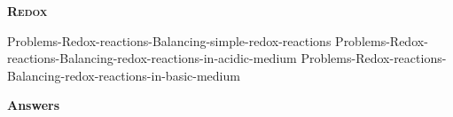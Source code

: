 \documentclass[main.tex]{subfiles}
\newcommand\chapterlabel{Ch-electrolytes}
\begin{document}
\begin{multicols*}{2}
{\raggedright\textsc{\textbf{Redox}}\par}%
{Problems-Redox-reactions-Balancing-simple-redox-reactions}%
{Problems-Redox-reactions-Balancing-redox-reactions-in-acidic-medium}%
{Problems-Redox-reactions-Balancing-redox-reactions-in-basic-medium}%









\end{multicols*}
\newpage
\begin{answersenvironment}
\begin{minipage}[c]{1\textwidth}
\begin{localsize}{10}
{\Large \bf Answers}
\printsolutions[byID={1,3,5,7,9,11,13,15,17,19,21,23,25,27,29, 31, 33, 35 }]
\end{localsize}
\end{minipage}\end{answersenvironment}
 \clearpage\thispagestyle{empty}\mbox{}
\end{document}

